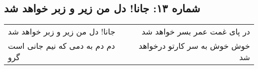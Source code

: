 \begin{center}
\section*{شماره ۱۳: جانا! دل من زیر و زبر خواهد شد}
\label{sec:013}
\begin{longtable}{l p{0.5cm} r}
جانا! دل من زیر و زبر خواهد شد
&&
در پای غمت عمر بسر خواهد شد
\\
دم دم به دمی که نیم جانی است گرو
&&
خوش خوش به سر کارتو درخواهد شد
\\
\end{longtable}
\end{center}
